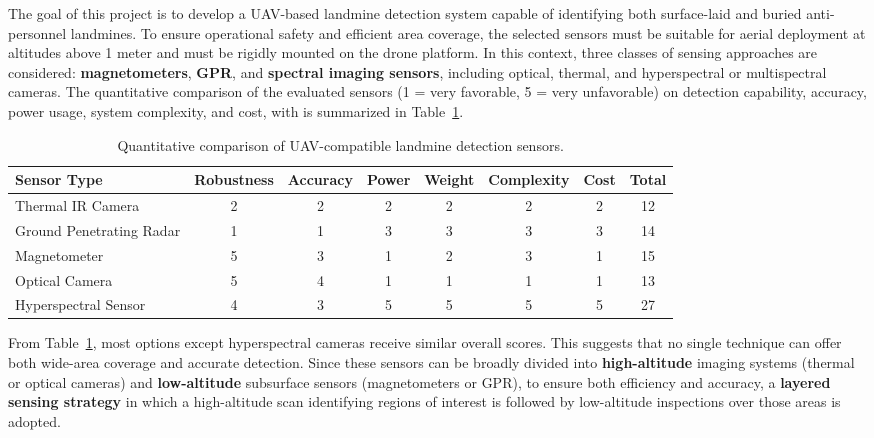 The goal of this project is to develop a \gls{UAV}-based landmine detection system capable of identifying both surface-laid and buried anti-personnel landmines. To ensure operational safety and efficient area coverage, the selected sensors must be suitable for aerial deployment at altitudes above 1 meter and must be rigidly mounted on the drone platform. In this context, three classes of sensing approaches are considered: \textbf{magnetometers}, \textbf{\gls{GPR}}, and \textbf{spectral imaging sensors}, including optical, thermal, and hyperspectral or multispectral cameras. The quantitative comparison of the evaluated sensors (1 = very favorable, 5 = very unfavorable) on detection capability, accuracy, power usage, system complexity, and cost, with is summarized in Table~\ref{tab:sensor_selection}.


\begin{table}[htbp]
    \centering
    \small
    \renewcommand{\arraystretch}{1.2}
    \begin{tabular}{@{} l c c c c c c c @{}}
        \toprule
        \textbf{Sensor Type} & \textbf{Robustness} & \textbf{Accuracy} & \textbf{Power} & \textbf{Weight} & \textbf{Complexity} & \textbf{Cost} & \textbf{Total} \\
        \midrule
        Thermal \gls{IR} Camera     & 2 & 2 & 2 & 2 & 2 & 2 & 12 \\
        Ground Penetrating Radar   & 1 & 1 & 3 & 3 & 3 & 3 & 14 \\
        Magnetometer               & 5 & 3 & 1 & 2 & 3 & 1 & 15 \\
        Optical Camera             & 5 & 4 & 1 & 1 & 1 & 1 & 13 \\
        Hyperspectral Sensor       & 4 & 3 & 5 & 5 & 5 & 5 & 27 \\
        \bottomrule
    \end{tabular}
    \caption[Comparison of UAV landmine detection sensors]{Quantitative comparison of UAV-compatible landmine detection sensors.}
    \label{tab:sensor_selection}
\end{table}


From Table~\ref{tab:sensor_selection}, most options except hyperspectral cameras receive similar overall scores. This suggests that no single technique can offer both wide-area coverage and accurate detection. Since these sensors can be broadly divided into \textbf{high-altitude} imaging systems (thermal or optical cameras) and \textbf{low-altitude} subsurface sensors (magnetometers or \gls{GPR}), to ensure both efficiency and accuracy, a \textbf{layered sensing strategy} in which a high-altitude scan identifying regions of interest is followed by low-altitude inspections over those areas is adopted.

